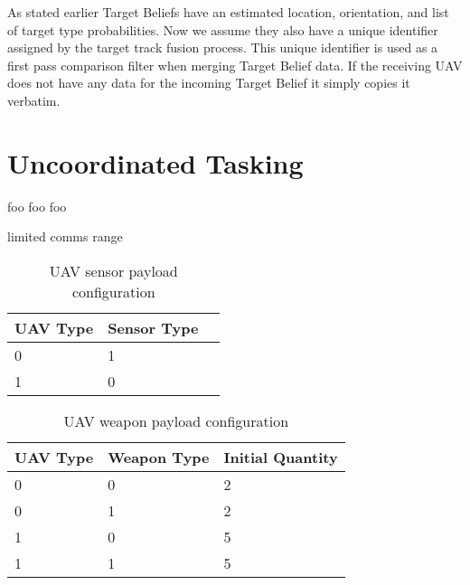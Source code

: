 As stated earlier Target Beliefs have an estimated location, orientation, and list of target type probabilities.  Now we assume they also have a unique identifier assigned by the target track fusion process.  This unique identifier is used as a first pass comparison filter when merging Target Belief data.  If the receiving UAV does not have any data for the incoming Target Belief it simply copies it verbatim.

\section{Uncoordinated Tasking}
\label{sec:uncoordTasking}
foo foo foo

limited comms range

\begin{table}[h]
	\caption{UAV sensor payload configuration}
	\centering
	\label{tab:uavSensorMap}
	\begin{tabular}{|p{1cm}|p{1cm}|p{1cm}|}
		\hline
		UAV Type & Sensor Type\\ \hline
		0 & 1 \\
		1 & 0 \\
		\hline
	\end{tabular}
\end{table}


\begin{table}[h]
	\caption{UAV weapon payload configuration}
	\centering
	\label{tab:uavWpnMap}
	\begin{tabular}{|p{1cm}|p{1.5cm}|p{2cm}|}
		\hline
		UAV Type & Weapon Type & Initial Quantity\\ \hline
		0 & 0 & 2 \\
		0 & 1 & 2 \\
		1 & 0 & 5 \\
		1 & 1 & 5 \\
		\hline
	\end{tabular}
\end{table}
